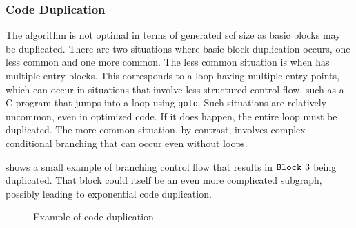 \subsubsection{Code Duplication}\label{sse:code_dup}
The algorithm is not optimal in terms of generated \ac{scf} size
as basic blocks may be duplicated.
There are two situations where basic block duplication occurs,
one less common and one more common.
The less common situation is when  has multiple entry blocks.
This corresponds to a loop having multiple entry points,
which can occur in situations that involve less-structured control flow,
such as a C program that jumps into a loop using \texttt{goto}.
Such situations are relatively uncommon, even in optimized code.
If it does happen, the entire loop must be duplicated.
The more common situation, by contrast, involves complex conditional branching
that can occur even without loops.
\begin{example}
   shows a small example of branching control flow
  that results in $\texttt{Block}~3$ being duplicated.
  That block could itself be an even more complicated subgraph,
  possibly leading to exponential code duplication.
\end{example}
\begin{figure}
  \hspace*{\fill}
  \hfill
  \hspace*{\fill}
  \caption{Example of code duplication}\label{fig:ex_nonopt}
\end{figure}


